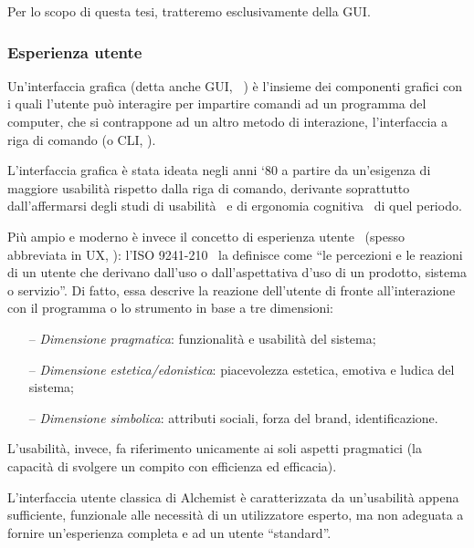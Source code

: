             Per lo scopo di questa tesi, tratteremo esclusivamente della GUI.

            \subsubsection{Esperienza utente}\label{subsubsec:prevUx}
                Un'interfaccia grafica (detta anche GUI, ~\cite{gui}) è l'insieme dei componenti grafici con i quali l'utente può interagire per impartire comandi ad un programma del computer, che si contrappone ad un altro metodo di interazione, l'interfaccia a riga di comando (o CLI, ).

                L'interfaccia grafica è stata ideata negli anni `80 a partire da un'esigenza di maggiore usabilità rispetto dalla riga di comando, derivante soprattutto dall'affermarsi degli studi di usabilità~\cite{norman1988} e di ergonomia cognitiva~\cite{cognitiveErgonomics} di quel periodo.

                Più ampio e moderno è invece il concetto di esperienza utente~\cite{ux} (spesso abbreviata in UX, ):
                l'ISO 9241-210~\cite{iso9241} la definisce come ``le percezioni e le reazioni di un utente che derivano dall'uso o dall'aspettativa d'uso di un prodotto, sistema o servizio''.
                Di fatto, essa descrive la reazione dell'utente di fronte all'interazione con il programma o lo strumento in base a tre dimensioni:
                \begin{itemize}
                    \item[--] \emph{Dimensione pragmatica}:
                        funzionalità e usabilità del sistema;
                    \item[--] \emph{Dimensione estetica/edonistica}:
                        piacevolezza estetica, emotiva e ludica del sistema;
                    \item[--] \emph{Dimensione simbolica}:
                        attributi sociali, forza del brand, identificazione.
                \end{itemize}
                L'usabilità, invece, fa riferimento unicamente ai soli aspetti pragmatici (la capacità di svolgere un compito con efficienza ed efficacia).

                L'interfaccia utente classica di Alchemist è caratterizzata da un'usabilità appena sufficiente, funzionale alle necessità di un utilizzatore esperto, ma non adeguata a fornire un'esperienza completa e  ad un utente ``standard''.


